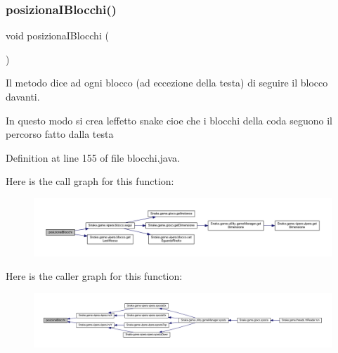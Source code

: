 \subsubsection{\texorpdfstring{posiziona\+I\+Blocchi()}{posizionaIBlocchi()}}
{\footnotesize\ttfamily void posiziona\+I\+Blocchi (\begin{DoxyParamCaption}{ }\end{DoxyParamCaption})}



Il metodo dice ad ogni blocco (ad eccezione della testa) di seguire il blocco davanti. 

In questo modo si crea l\textquotesingle{}effetto snake cioe\textquotesingle{} che i blocchi della coda seguono il percorso fatto dalla testa 

Definition at line 155 of file blocchi.\+java.

Here is the call graph for this function\+:
\nopagebreak
\begin{figure}[H]
\begin{center}
\leavevmode
\includegraphics[width=350pt]{class_snake_1_1game_1_1vipera_1_1blocchi_a2fbeb7ff9ae1fc1f5c5b1a885900034c_cgraph}
\end{center}
\end{figure}
Here is the caller graph for this function\+:
\nopagebreak
\begin{figure}[H]
\begin{center}
\leavevmode
\includegraphics[width=350pt]{class_snake_1_1game_1_1vipera_1_1blocchi_a2fbeb7ff9ae1fc1f5c5b1a885900034c_icgraph}
\end{center}
\end{figure}
\mbox{\label{class_snake_1_1game_1_1vipera_1_1blocchi_a0479241855807563d1a7ed14bb5210cd}} 
